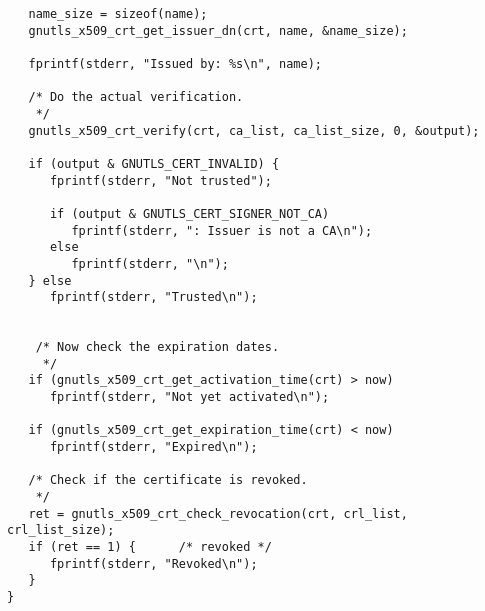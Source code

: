 \begin{verbatim}
   name_size = sizeof(name);
   gnutls_x509_crt_get_issuer_dn(crt, name, &name_size);

   fprintf(stderr, "Issued by: %s\n", name);

   /* Do the actual verification.
    */
   gnutls_x509_crt_verify(crt, ca_list, ca_list_size, 0, &output);

   if (output & GNUTLS_CERT_INVALID) {
      fprintf(stderr, "Not trusted");

      if (output & GNUTLS_CERT_SIGNER_NOT_CA)
         fprintf(stderr, ": Issuer is not a CA\n");
      else
         fprintf(stderr, "\n");
   } else
      fprintf(stderr, "Trusted\n");


    /* Now check the expiration dates.
     */
   if (gnutls_x509_crt_get_activation_time(crt) > now)
      fprintf(stderr, "Not yet activated\n");

   if (gnutls_x509_crt_get_expiration_time(crt) < now)
      fprintf(stderr, "Expired\n");

   /* Check if the certificate is revoked.
    */
   ret = gnutls_x509_crt_check_revocation(crt, crl_list, crl_list_size);
   if (ret == 1) {		/* revoked */
      fprintf(stderr, "Revoked\n");
   }
}

\end{verbatim}
